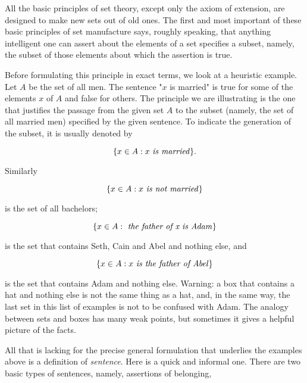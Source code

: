 
All the basic principles of set theory, except only the axiom of extension, are designed to make new sets out of old ones. The first and most important of these basic principles of set manufacture says, roughly speaking, that anything intelligent one can assert about the elements of a set specifies a subset, namely, the subset of those elements about which the assertion is true.

Before formulating this principle in exact terms, we look at a heuristic example. Let $A$ be the set of all men. The sentence "$x$ is married" is true for some of the elements $x$ of $A$ and false for others. The principle we are illustrating is the one that justifies the passage from the given set $A$ to the subset (namely, the set of all married men) specified by the given sentence. To indicate the generation of the subset, it is usually denoted by 

\begin{equation*}
\{ x \in A: x \text{ \textit{is married}} \}.
\end{equation*}

Similarly 

\begin{equation*}
\{ x \in A: x \text{ \textit{is not married}} \}
\end{equation*}

is the set of all bachelors; 

\begin{equation*}
\{ x \in A: \text{ \textit{the father of x is Adam}} \} 
\end{equation*}

is the set that contains Seth, Cain and Abel and nothing else, and

\begin{equation*}
\{ x \in A: x \text{ \textit{is the father of Abel}} \}  
\end{equation*}

is the set that contains Adam and nothing else. Warning: a box that contains a hat and nothing else is not the same thing as a hat, and, in the same way, the last set in this list of examples is not to be confused with Adam. The analogy between sets and boxes has many weak points, but sometimes it gives a helpful picture of the facts. 

All that is lacking for the precise general formulation that underlies the examples above is a definition of \textit{sentence}. Here is a quick and informal one. There are two basic types of sentences, namely, assertions of belonging,


